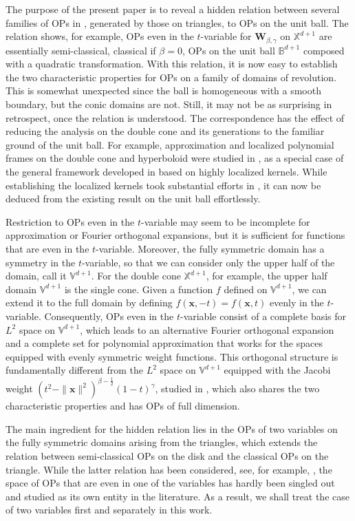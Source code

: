 \documentclass{amsart}
\theoremstyle{remark}
\def\b{{\beta}}
\def\g{{\gamma}}
\def\xb{{\mathbf x}}
\def\Wb{{\mathbf W}}
\def\BB{{\mathbb B}}
\def\VV{{\mathbb V}}
\def\XX{{\mathbb X}}
\def\f{\frac}
\begin{document}
The purpose of the present paper is to reveal a hidden relation between several families of OPs in \cite{X24}, 
generated by those on triangles, to OPs on the unit ball. The relation shows, for example, OPs even in the 
$t$-variable for $\Wb_{\b,\g}$ on $\XX^{d+1}$ are essentially semi-classical, classical if $\b =0$, OPs on the 
unit ball $\BB^{d+1}$ composed with a quadratic transformation. With this relation, it is now easy to establish 
the two characteristic properties for OPs on a family of domains of revolution. This is somewhat unexpected 
since the ball is homogeneous with a smooth boundary, but the conic domains are not. Still, it may not be as 
surprising in retrospect, once the relation is understood. The correspondence has the effect of reducing the 
analysis on the double cone and its generations to the familiar ground of the unit ball. For example, 
approximation and localized polynomial frames on the double cone and hyperboloid were studied in \cite{X23a}, 
as a special case of the general framework developed in \cite{X21} based on highly localized kernels. While 
establishing the localized kernels took substantial efforts in \cite{X23a}, it can now be deduced from the 
existing result on the unit ball effortlessly. 

Restriction to OPs even in the $t$-variable may seem to be incomplete for approximation or Fourier orthogonal
expansions, but it is sufficient for functions that are even in the $t$-variable. Moreover, the fully symmetric
domain has a symmetry in the $t$-variable, so that we can consider only the upper half of the domain, call
it $\VV^{d+1}$. For the double cone $\XX^{d+1}$, for example, the upper half domain $\VV^{d+1}$ is the 
single cone. Given a function $f$ defined on $\VV^{d+1}$, we can extend it to the full domain by defining 
$f(\xb,-t) = f(\xb,t)$ evenly in the $t$-variable. Consequently, OPs even in the $t$-variable consist of a 
complete basis for $L^2$ space on $\VV^{d+1}$, which leads to an alternative Fourier orthogonal expansion
and a complete set for polynomial approximation that works for the spaces equipped with evenly symmetric
weight functions. This orthogonal structure is fundamentally different from the $L^2$ space on $\VV^{d+1}$ 
equipped with the Jacobi weight $(t^2-\|\xb\|^2)^{\b-\f12}(1-t)^\g$, studied in \cite{X20}, which also shares 
the two characteristic properties and has OPs of full dimension. 

The main ingredient for the hidden relation lies in the OPs of two variables on the fully symmetric domains
arising from the triangles, which extends the relation between semi-classical OPs on the disk and the 
classical OPs on the triangle. While the latter relation has been considered, see, for example,
\cite{DX, X24}, the space of OPs that are even in one of the variables has 
hardly been singled out and studied as its own entity in the literature. As a result, we shall treat the case
of two variables first and separately in this work. 
\end{document}
